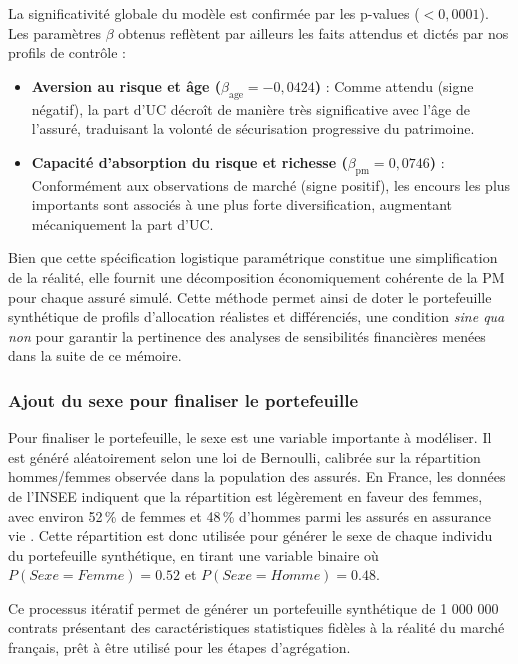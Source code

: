 La significativité globale du modèle est confirmée par les p-values ($< 0,0001$). Les paramètres $\beta$ obtenus reflètent par ailleurs les faits attendus et dictés par nos profils de contrôle :
\begin{itemize}
    \item \textbf{Aversion au risque et âge ($\beta_{\text{age}} = -0,0424$)} : Comme attendu (signe négatif), la part d'UC décroît de manière très significative avec l'âge de l'assuré, traduisant la volonté de sécurisation progressive du patrimoine.
    \item \textbf{Capacité d'absorption du risque et richesse ($\beta_{\text{pm}} = 0,0746$)} : Conformément aux observations de marché (signe positif), les encours les plus importants sont associés à une plus forte diversification, augmentant mécaniquement la part d'UC.
\end{itemize}

Bien que cette spécification logistique paramétrique constitue une simplification de la réalité, elle fournit une décomposition économiquement cohérente de la PM pour chaque assuré simulé. Cette méthode permet ainsi de doter le portefeuille synthétique de profils d'allocation réalistes et différenciés, une condition \textit{sine qua non} pour garantir la pertinence des analyses de sensibilités financières menées dans la suite de ce mémoire.

\subsubsection{Ajout du sexe pour finaliser le portefeuille}

Pour finaliser le portefeuille, le sexe est une variable importante à modéliser. Il est généré aléatoirement selon une loi de Bernoulli, calibrée sur la répartition hommes/femmes observée dans la population des assurés. En France, les données de l'INSEE indiquent que la répartition est légèrement en faveur des femmes, avec environ 52\,\% de femmes et 48\,\% d'hommes parmi les assurés en assurance vie \cite{repartition_hommes_femmes}. Cette répartition est donc utilisée pour générer le sexe de chaque individu du portefeuille synthétique, en tirant une variable binaire où $P(Sexe = Femme) = 0.52$ et $P(Sexe = Homme) = 0.48$.

Ce processus itératif permet de générer un portefeuille synthétique de 1 000 000 contrats présentant des caractéristiques statistiques fidèles à la réalité du marché français, prêt à être utilisé pour les étapes d'agrégation.

